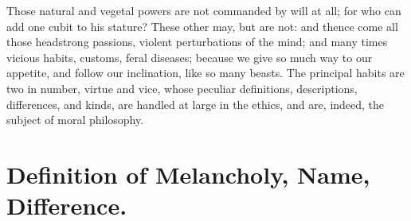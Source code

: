 {Those natural and vegetal powers are not commanded by will at all; for
who can add one cubit to his stature? These other may, but are not: and
thence come all those headstrong passions, violent perturbations of the
mind; and many times vicious habits, customs, feral diseases; because
we give so much way to our appetite, and follow our inclination, like
so many beasts. The principal habits are two in number, virtue and
vice, whose peculiar definitions, descriptions, differences, and kinds,
are handled at large in the ethics, and are, indeed, the subject of
moral philosophy.


\section{Definition of Melancholy, Name, Difference.}\label{sec:definition}

}
